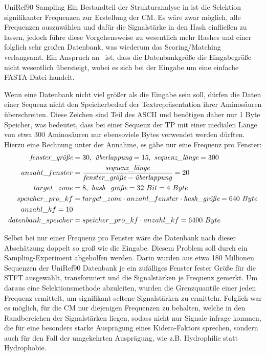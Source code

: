     \begin{experiment}{UniRef90 Sampling} %
        \label{exp:uniref90}
        Ein Bestandteil der Strukturanalyse in  ist die Selektion signifikanter Frequenzen zur Erstellung der \ac{CM}. Es wäre zwar möglich, alle Frequenzen auszuwählen und dafür die Signalstärke in den Hash einfließen zu lassen, jedoch führe diese Vorgehensweise zu wesentlich mehr Hashes und einer folglich sehr großen Datenbank, was wiederum das Scoring/Matching verlangsamt. Ein Anspruch an \protfin\ ist, dass die Datenbankgröße die Eingabegröße nicht wesentlich übersteigt, wobei es sich bei der Eingabe um eine einfache FASTA-Datei handelt.

         Wenn eine Datenbank nicht viel größer als die Eingabe sein soll, dürfen die Daten einer Sequenz nicht den Speicherbedarf der Textrepräsentation ihrer Aminosäuren überschreiten. Diese Zeichen sind Teil des \ac{ASCII} und benötigen daher nur 1 Byte Speicher, was bedeutet, dass bei einer Sequenz der \ac{TP} mit einer medialen Länge von etwa 300 Aminosäuren nur ebensoviele Bytes verwendet werden dürften. Hierzu eine Rechnung unter der Annahme, es gäbe nur eine Frequenz pro Fenster:
        \begin{equation}
            \begin{split}
                \emph{fenster\_größe} &= 30,\ \emph{überlappung} = 15,\ \emph{sequenz\_länge} = 300\\
                anzahl\_fenster &= \frac{\emph{sequenz\_länge}}{\emph{fenster\_größe} - \emph{überlappung}} = 20\\
                target\_zone &= 8,\ \emph{hash\_größe} = 32\ Bit = 4\ Byte\\
                speicher\_pro\_kf &= target\_zone \cdot anzahl\_fenster \cdot \emph{hash\_größe} = 640\ Byte\\
                anzahl\_kf = 10\\
                datenbank\_speicher &= speicher\_pro\_kf \cdot anzahl\_kf = 6400\ Byte
            \end{split}
        \end{equation}

        Selbst bei nur einer Frequenz pro Fenster wäre die Datenbank nach dieser Abschätzung doppelt so groß wie die Eingabe. Diesem Problem soll durch ein Sampling-Experiment abgeholfen werden. Darin wurden aus etwa 180 Millionen Sequenzen der UniRef90 Datenbank je ein zufälliges Fenster fester Größe für die \ac{STFT} ausgewählt, transformiert und die Signalstärken je Frequenz gemerkt. Um daraus eine Selektionsmethode abzuleiten, wurden die Grenzquantile einer jeden Frequenz ermittelt, um signifikant seltene Signalstärken zu ermitteln. Folglich war es möglich, für die \ac{CM} nur diejenigen Frequenzen zu behalten, welche in den Randbereichen der Signalstärken liegen, sodass nicht nur Signale infrage kommen, die für eine besonders starke Ausprägung eines Kidera-Faktors sprechen, sondern auch für den Fall der umgekehrten Ausprägung, wie z.B. Hydrophilie statt Hydrophobie.


\end{experiment}
